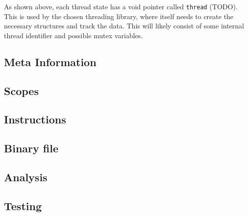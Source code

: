 As shown above, each thread state has a void pointer called {\tt thread}
(TODO). This is used by the chosen threading library, where itself needs to
create the necessary structures and track the data. This will likely consist of
some internal thread identifier and possible mutex variables.

\subsection{Meta Information}


\subsection{Scopes}

\subsection{Instructions}
\label{sec:implementation:instr}


\subsection{Binary file}

\subsection{Analysis}

\subsection{Testing}








